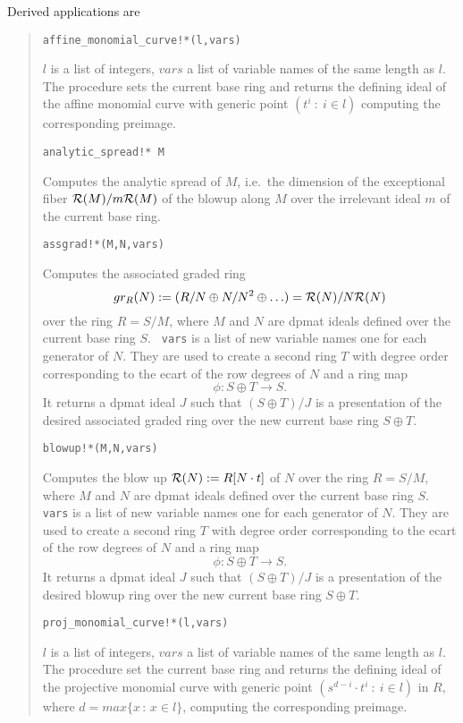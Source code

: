 \documentclass[a4paper,11pt]{article}
\newcommand{\pbx}[1]{\mbox{}\hfill \parbox[t]{12cm}{#1} \pagebreak[3]}
\begin{document}
Derived applications are
\begin{quote}
\verb|affine_monomial_curve!*(l,vars)|

\pbx{$l$ is a list of integers, $vars$ a list of variable names of the
same length as $l$. The procedure sets the current base ring and
returns the defining ideal of the affine monomial curve with generic
point $(t^i\ :\ i\in l)$ computing the corresponding preimage.}

\verb|analytic_spread!* M|

\pbx{Computes the analytic spread of $M$, i.e.\ the dimension of the
exceptional fiber ${\cal R}(M)/m{\cal R}(M)$ of the blowup along $M$ 
over the irrelevant ideal $m$ of the current base ring.}
       
\verb|assgrad!*(M,N,vars)|

\pbx{Computes the associated graded ring \[gr_R(N):=
(R/N\oplus N/N^2\oplus\ldots)={\cal R}(N)/N{\cal R}(N)\] over the ring
$R=S/M$, where $M$ and
$N$ are dpmat ideals defined over the current base ring $S$. {\tt
vars} is a list of new variable names one for each generator of $N$.
They are used to create a second ring $T$ with degree order
corresponding to the ecart of the row degrees of $N$ and a ring map
\[\phi : S\oplus T\longrightarrow S.\]
It returns a dpmat ideal $J$ such that $(S\oplus T)/J$ is  a 
presentation of the
desired associated graded ring over the new current base ring
$S\oplus T$.}
       
\verb|blowup!*(M,N,vars)|

\pbx{Computes the blow up ${\cal R}(N):=R[N\cdot t]$ of $N$ over
the ring $R=S/M$, where $M$ and $N$ are dpmat ideals defined over the
current base ring $S$. {\tt vars} is a list of new variable names one
for each generator of $N$. They are used to create a second ring $T$
with degree order corresponding to the ecart of the row degrees of
$N$ and a ring map
\[\phi : S\oplus T\longrightarrow S.\]
It returns a dpmat ideal $J$ such that $(S\oplus T)/J$ is 
a presentation of the
desired blowup ring over the new current base ring $S\oplus T$.}
       
\verb|proj_monomial_curve!*(l,vars)|

\pbx{$l$ is a list of integers, $vars$ a list of variable names of the
same length as $l$. The procedure set the current base ring and
returns the defining ideal of the projective monomial curve with
generic point \mbox{$(s^{d-i}\cdot t^i\ :\ i\in l)$} in $R$, where 
\mbox{$d=max\{ x\, :\, x\in l\}$}, computing the corresponding preimage.}


\end{quote}
\end{document}
